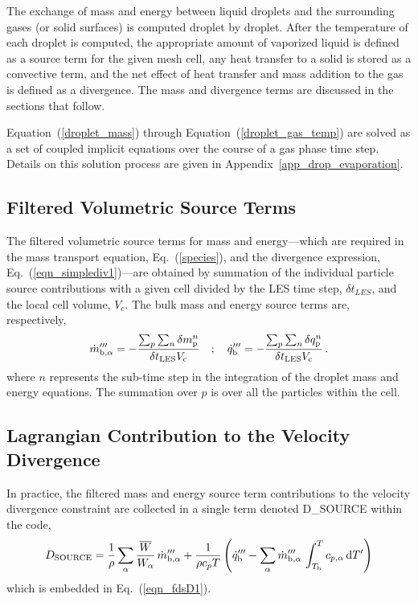 The exchange of mass and energy between liquid droplets and the surrounding gases (or solid surfaces) is computed droplet by droplet. After the temperature of each droplet is computed, the
appropriate amount of vaporized liquid is defined as a source term for the given mesh cell, any heat transfer to a solid is stored as a convective term, and the net effect of heat transfer and mass addition to the gas is defined as a divergence. The mass and divergence terms are discussed in the sections that follow.

Equation~(\ref{droplet_mass}) through Equation~(\ref{droplet_gas_temp}) are solved as a set of coupled implicit equations over the course of a gas phase time step. Details on this solution process are given in Appendix~\ref{app_drop_evaporation}.

\subsection{Filtered Volumetric Source Terms}

The filtered volumetric source terms for mass and energy---which are required in the mass transport equation, Eq.~(\ref{species}), and the divergence expression, Eq.~(\ref{eqn_simplediv1})---are obtained by summation of the individual particle source contributions with a given cell divided by the LES time step, $\delta t_{\si{LES}}$, and the local cell volume, $V_{\si{c}}$. The bulk mass and energy source terms are, respectively,
\begin{equation}
\label{eq:bulk_source}
\dot{m}_{{\rm b},\alpha}^{\ppp} = - \frac{ \sum_p \sum_n \delta m_{\si{p}}^n }{\delta t_{\si{LES}} V_{\si{c}}} \quad ; \quad
\dot{q}_{\rm b}^{\ppp} = - \frac{ \sum_p \sum_n \delta q_{\si{p}}^n }{\delta t_{\si{LES}} V_{\si{c}}} \,\mbox{.}
\end{equation}
where $n$ represents the sub-time step in the integration of the droplet mass and energy equations.  The summation over $p$ is over all the particles within the cell.

\subsection{Lagrangian Contribution to the Velocity Divergence}

In practice, the filtered mass and energy source term contributions to the velocity divergence constraint are collected in a single term denoted {\ct D\_SOURCE} within the code,
\begin{equation}
D_{\si{\tiny SOURCE}} = \frac{1}{\rho} \sum_\alpha \frac{\overline{W}}{W_\alpha} \, \dot{m}_{{\rm b},\alpha}^{\ppp} + \frac{1}{\rho c_p T} \left( \dot{q}_{\rm b}^{\ppp} - \sum_\alpha \dot{m}_{{\rm b},\alpha}^{\ppp} \, \int_{T_{\rm b}}^T c_{p,\alpha} \d T'  \right)
\label{eq:D_SOURCE_vap}
\end{equation}
which is embedded in Eq.~(\ref{eqn_fdsD1}).

